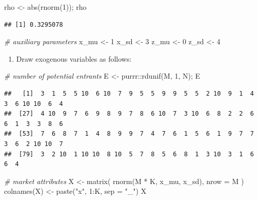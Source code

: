 \documentclass[
]{book}
\newenvironment{Shaded}{\begin{snugshade}}{\end{snugshade}}
\newcommand{\AttributeTok}[1]{\textcolor[rgb]{0.77,0.63,0.00}{#1}}
\newcommand{\CommentTok}[1]{\textcolor[rgb]{0.56,0.35,0.01}{\textit{#1}}}
\newcommand{\DecValTok}[1]{\textcolor[rgb]{0.00,0.00,0.81}{#1}}
\newcommand{\FunctionTok}[1]{\textcolor[rgb]{0.00,0.00,0.00}{#1}}
\newcommand{\NormalTok}[1]{#1}
\newcommand{\OtherTok}[1]{\textcolor[rgb]{0.56,0.35,0.01}{#1}}
\newcommand{\SpecialCharTok}[1]{\textcolor[rgb]{0.00,0.00,0.00}{#1}}
\newcommand{\StringTok}[1]{\textcolor[rgb]{0.31,0.60,0.02}{#1}}
\providecommand{\tightlist}{%
  \setlength{\itemsep}{0pt}\setlength{\parskip}{0pt}}
\begin{document}
\begin{Shaded}
\begin{Highlighting}[]
\NormalTok{rho }\OtherTok{\textless{}{-}} \FunctionTok{abs}\NormalTok{(}\FunctionTok{rnorm}\NormalTok{(}\DecValTok{1}\NormalTok{)); rho}
\end{Highlighting}
\end{Shaded}

\begin{verbatim}
## [1] 0.3295078
\end{verbatim}

\begin{Shaded}
\begin{Highlighting}[]
\CommentTok{\# auxiliary parameters}
\NormalTok{x\_mu }\OtherTok{\textless{}{-}} \DecValTok{1}
\NormalTok{x\_sd }\OtherTok{\textless{}{-}} \DecValTok{3}
\NormalTok{z\_mu }\OtherTok{\textless{}{-}} \DecValTok{0}
\NormalTok{z\_sd }\OtherTok{\textless{}{-}} \DecValTok{4}
\end{Highlighting}
\end{Shaded}

\begin{enumerate}
\def\labelenumi{\arabic{enumi}.}
\setcounter{enumi}{2}
\tightlist
\item
  Draw exogenous variables as follows:
\end{enumerate}

\begin{Shaded}
\begin{Highlighting}[]
\CommentTok{\# number of potential entrants}
\NormalTok{E }\OtherTok{\textless{}{-}}\NormalTok{ purrr}\SpecialCharTok{::}\FunctionTok{rdunif}\NormalTok{(M, }\DecValTok{1}\NormalTok{, N); E}
\end{Highlighting}
\end{Shaded}

\begin{verbatim}
##   [1]  3  1  5  5 10  6 10  7  9  5  5  9  9  5  5  2 10  9  1  4  3  6 10 10  6  4
##  [27]  4 10  9  7  6  9  8  9  7  8  6 10  7  3 10  6  8  2  2  6  6  1  3  3  8  6
##  [53]  7  6  8  7  1  4  8  9  9  7  4  7  6  1  5  6  1  9  7  7  3  6  2 10 10  7
##  [79]  3  2 10  1 10 10  8 10  5  7  8  5  6  8  1  3 10  3  1  6  6  4
\end{verbatim}

\begin{Shaded}
\begin{Highlighting}[]
\CommentTok{\# market attributes}
\NormalTok{X }\OtherTok{\textless{}{-}} \FunctionTok{matrix}\NormalTok{(}
  \FunctionTok{rnorm}\NormalTok{(M }\SpecialCharTok{*}\NormalTok{ K, x\_mu, x\_sd),}
  \AttributeTok{nrow =}\NormalTok{ M}
\NormalTok{)}
\FunctionTok{colnames}\NormalTok{(X) }\OtherTok{\textless{}{-}} \FunctionTok{paste}\NormalTok{(}\StringTok{"x"}\NormalTok{, }\DecValTok{1}\SpecialCharTok{:}\NormalTok{K, }\AttributeTok{sep =} \StringTok{"\_"}\NormalTok{)}
\NormalTok{X}
\end{Highlighting}
\end{Shaded}
\end{document}
